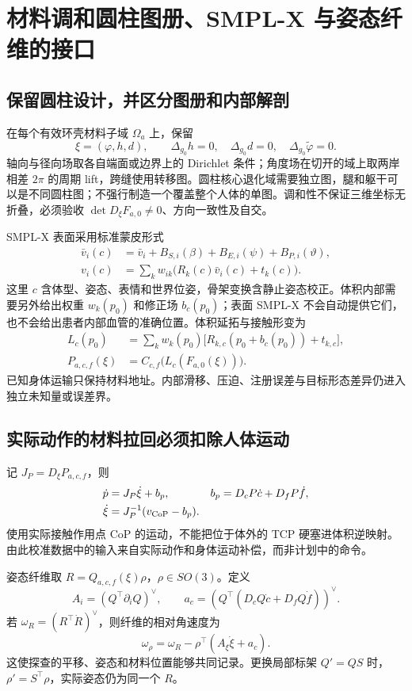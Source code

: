 \documentclass[11pt,a4paper]{article}
\numberwithin{equation}{section}
\theoremstyle{definition}
\begin{document}
\section{材料调和圆柱图册、SMPL-X 与姿态纤维的接口}
\subsection{保留圆柱设计，并区分图册和内部解剖}
在每个有效环壳材料子域 $\Omega_a$ 上，保留
\begin{equation}
 \xi=(\varphi,h,d),\qquad
 \Delta_{g_0}h=0,\quad \Delta_{g_0}d=0,\quad
 \Delta_{g_0}\widetilde\varphi=0.
\end{equation}
轴向与径向场取各自端面或边界上的 Dirichlet 条件；角度场在切开的域上取两岸相差 $2\pi$ 的周期 lift，跨缝使用转移图。圆柱核心退化域需要独立图，腿和躯干可以是不同圆柱图；不强行制造一个覆盖整个人体的单图。调和性不保证三维坐标无折叠，必须验收 $\det D_\xi F_{a,0}\ne0$、方向一致性及自交。

SMPL-X 表面采用标准蒙皮形式\cite{pavlakos2019}
\begin{align}
 \bar v_i(c)&=\bar v_i+B_{S,i}(\beta)+B_{E,i}(\psi)+B_{P,i}(\vartheta),\\
 v_i(c)&=\sum_k w_{ik}\bigl(R_k(c)\bar v_i(c)+t_k(c)\bigr).
\end{align}
这里 $c$ 含体型、姿态、表情和世界位姿，骨架变换含静止姿态校正。体积内部需要另外给出权重 $w_k(p_0)$ 和修正场 $b_c(p_0)$；表面 SMPL-X 不会自动提供它们，也不会给出患者内部血管的准确位置。体积延拓与接触形变为
\begin{align}
 L_c(p_0)&=\sum_k w_k(p_0)\bigl[R_{k,c}(p_0+b_c(p_0))+t_{k,c}\bigr],\\
 P_{a,c,f}(\xi)&=C_{c,f}\bigl(L_c(F_{a,0}(\xi))\bigr).
\end{align}
已知身体运输只保持材料地址。内部滑移、压迫、注册误差与目标形态差异仍进入独立未知量或误差界。

\subsection{实际动作的材料拉回必须扣除人体运动}
记 $J_P=D_\xi P_{a,c,f}$，则
\begin{align}
 \dot p&=J_P\dot\xi+b_p,
 &b_p&=D_cP\dot c+D_fP\dot f,\\
 \dot\xi&=J_P^{-1}(v_{\rm CoP}-b_p).
\end{align}
使用实际接触作用点 CoP 的运动，不能把位于体外的 TCP 硬塞进体积逆映射。由此校准数据中的输入来自实际动作和身体运动补偿，而非计划中的命令。

姿态纤维取 $R=Q_{a,c,f}(\xi)\rho$，$\rho\in SO(3)$。定义
\begin{equation}
 A_i=(Q^\top\partial_iQ)^\vee,\qquad
 a_c=(Q^\top(D_cQ\dot c+D_fQ\dot f))^\vee .
\end{equation}
若 $\omega_R=(R^\top\dot R)^\vee$，则纤维的相对角速度为
\begin{equation}
 \omega_\rho=\omega_R-\rho^\top(A_\xi\dot\xi+a_c).
\end{equation}
这使探查的平移、姿态和材料位置能够共同记录。更换局部标架 $Q'=QS$ 时，$\rho'=S^\top\rho$，实际姿态仍为同一个 $R$。
\end{document}
